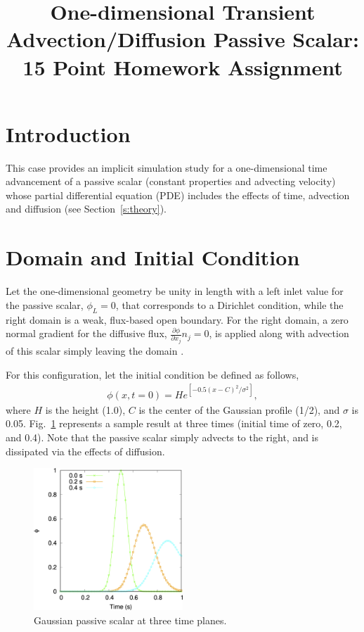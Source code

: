 \documentclass{article}
\title{One-dimensional Transient Advection/Diffusion Passive Scalar: 15 Point Homework Assignment}
\date{}
\begin{document}
\maketitle

\section{Introduction}
This case provides an implicit simulation study for a one-dimensional time advancement
of a passive scalar (constant properties and advecting velocity) whose partial differential
equation (PDE) includes the effects of time, advection and diffusion (see Section~\ref{s:theory}).

\section{Domain and Initial Condition}
Let the one-dimensional geometry be unity in length with a left inlet value for the passive scalar, $\phi_L = 0$, that corresponds to a Dirichlet condition, while the right domain is a weak, flux-based open boundary. For the right domain, a zero normal gradient for the diffusive flux, $\frac{\partial \phi}{\partial x_j} n_j = 0$, is applied along with advection of this scalar simply leaving the domain . 

For this configuration, let the initial condition be defined as follows,
\begin{align}
\phi(x,t=0) = H e^{\left[{-0.5\left(x-C\right)^2/ \sigma^2}\right]},
\end{align}
where $H$ is the height (1.0), $C$ is the center of the Gaussian profile (1/2), and $\sigma$ is 0.05. Fig.~\ref{fig:IC} represents a sample result at three times (initial time of zero, 0.2, and 0.4). Note that the passive scalar simply advects to the right, and is dissipated via the effects of diffusion.

\begin{figure}[h]
    \centering
    \includegraphics[width=0.5\textwidth]{passiveAdvDiff.png}
    \caption{Gaussian passive scalar at three time planes.}
    \label{fig:IC}
\end{figure}
\end{document}
